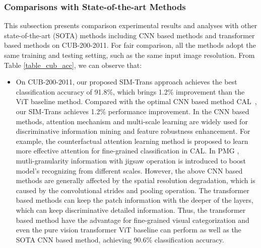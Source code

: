 \documentclass[sigconf, nonacm]{acmart}
\begin{document}
\subsubsection{ \textbf{Comparisons with State-of-the-art Methods }}

This subsection presents comparison experimental results and analyses with other state-of-the-art (SOTA) methods including CNN based methods and transformer based methods on CUB-200-2011. For fair comparison, all the methods adopt the same training and testing setting, such as the same input image resolution. From Table \ref{table_cub_acc}, we can observe that:

\begin{itemize}[leftmargin=30pt]
\item {On CUB-200-2011, our proposed SIM-Trans approach achieves the best classification accuracy of 91.8\%, which brings 1.2\% improvement than the ViT baseline method. Compared with the optimal CNN based method CAL~\cite{rao2021counterfactual}, our SIM-Trans achieves 1.2\% performance improvement. In the CNN based methods, attention mechanism and multi-scale learning are widely used for discriminative information mining and feature robustness enhancement. For example, the counterfactual attention learning method is proposed to learn more effective attention for fine-grained classification in CAL. In PMG \cite{du2020fine}, mutli-granularity information with jigsaw operation is introduced to boost model’s recognizing from different scales. However, the above CNN based methods are generally affected by the spatial resolution degradation, which is caused by the convolutional strides and pooling operation. The transformer based methods can keep the patch information with the deeper of the layers, which can keep discriminative detailed information. Thus, the transformer based method have the advantage for fine-grained visual categorization and even the pure vision transformer ViT baseline can perform as well as the SOTA CNN based method, achieving 90.6\% classification accuracy.
} 


\end{itemize}
\end{document}
